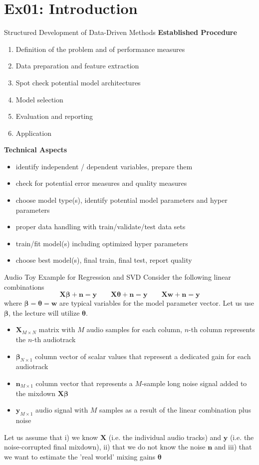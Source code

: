 \documentclass[mathserif, aspectratio=43]{intbeamer}
\begin{document}
\section{Ex01: Introduction}
\begin{frame}{Structured Development of Data-Driven Methods}
\textbf{Established Procedure}
\begin{enumerate}
\item Definition of the problem and of performance measures
\item Data preparation and feature extraction
\item Spot check potential model architectures
\item Model selection
\item Evaluation and reporting
\item Application
\end{enumerate}
\textbf{Technical Aspects}
\begin{itemize}
\item identify independent / dependent variables, prepare them
\item check for potential error measures and quality measures
\item choose model type(s), identify potential model parameters and hyper parameters
\item proper data handling with train/validate/test data sets
\item train/fit model(s) including optimized hyper parameters
\item choose best model(s), final train, final test, report quality
\end{itemize}
\end{frame}




\begin{frame}{Audio Toy Example for Regression and SVD}
Consider the following linear combinations
$$\bm{X} \bm{\beta} + \bm{n} = \bm{y}\qquad
\bm{X} \bm{\theta} + \bm{n} = \bm{y}\qquad
\bm{X} \bm{w} + \bm{n} = \bm{y}$$
where $\bm{\beta}=\bm{\theta} = \bm{w}$ are typical variables for the model parameter vector. Let us use $\bm{\beta}$, the lecture will utilize $\bm{\theta}$.
%
\begin{itemize}
\item $\bm{X}_{M \times N}$ matrix with $M$ audio samples for each column, $n$-th column represents the $n$-th audiotrack
\item $\bm{\beta}_{N \times 1}$ column vector of scalar values that represent a dedicated gain for each audiotrack
\item $\bm{n}_{M \times 1}$ column vector that represents a $M$-sample long noise signal added to the mixdown $\bm{X} \bm{\beta}$
\item $\bm{y}_{M \times 1}$ audio signal with $M$ samples as a result of the linear combination plus noise
\end{itemize}
%
Let us assume that i) we know $\bm{X}$ (i.e. the individual audio tracks) and $\bm{y}$ (i.e. the noise-corrupted final mixdown), ii) that we do not know the noise $\bm{n}$ and iii) that we want to estimate the 'real world' mixing gains $\bm{\theta}$
\end{frame}
\end{document}
